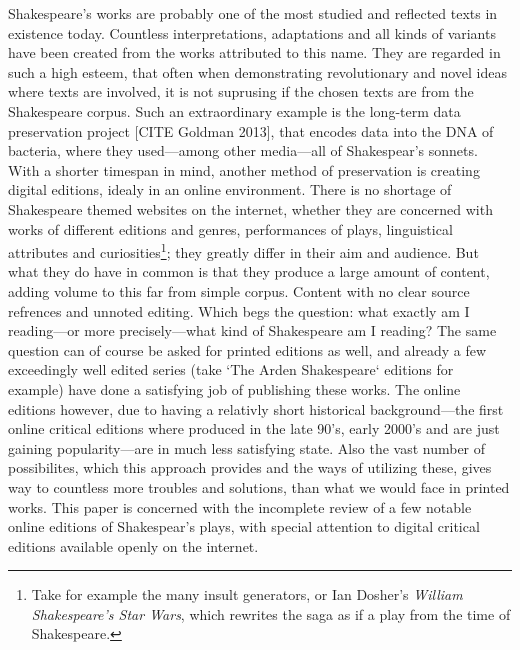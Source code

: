 
Shakespeare's works are probably one of the most studied and reflected texts in existence today. Countless interpretations, adaptations and all kinds of variants have been created from the works attributed to this name. They are regarded in such a high esteem, that often when demonstrating revolutionary and novel ideas where texts are involved, it is not suprusing if the chosen texts are from the Shakespeare corpus. 
Such an extraordinary example is the long-term data preservation project [CITE Goldman 2013], that encodes data into the DNA of bacteria, where they used---among other media---all of Shakespear's sonnets. With a shorter timespan in mind, another method of preservation is creating digital editions, idealy in an online environment. There is no shortage of Shakespeare themed websites on the internet, whether they are concerned with works of different editions and genres, performances of plays, linguistical attributes and curiosities\footnote{Take for example the many insult generators, or Ian Dosher's \textit{William Shakespeare's Star Wars}, which rewrites the saga as if a play from the time of Shakespeare.}; they greatly differ in their aim and audience. 
But what they do have in common is that they produce a large amount of content, adding volume to this far from simple corpus. Content with no clear source refrences and unnoted editing. Which begs the question: what exactly am I reading---or more precisely---what kind of Shakespeare am I reading? The same question can of course be asked for printed editions as well, and already a few exceedingly well edited series (take `The Arden Shakespeare` editions for example) have done a satisfying job of publishing these works. The online editions however, due to having a relativly short historical background---the first online critical editions where produced in the late 90's, early 2000's and are just gaining popularity---are in much less satisfying state. Also the vast number of possibilites, which this approach provides and the ways of utilizing these, gives way to countless more troubles and solutions, than what we would face in printed works. This paper is concerned with the incomplete review of a few notable online editions of Shakespear's plays, with special attention to digital critical editions available openly on the internet.
